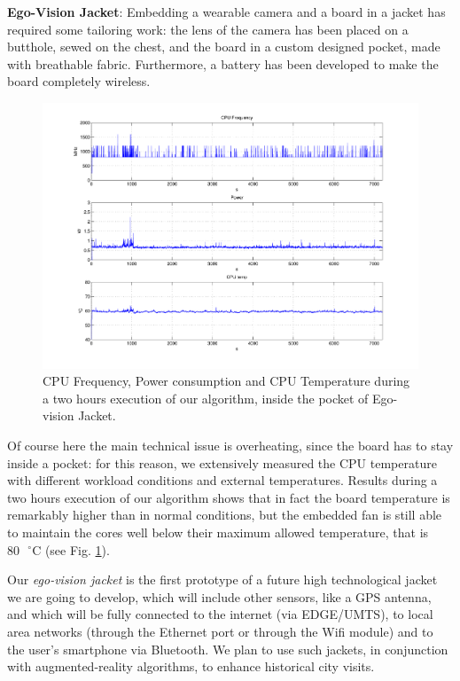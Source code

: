 \textbf{Ego-Vision Jacket}: Embedding a wearable camera and a board in a jacket has required some tailoring work: the lens of the camera has been placed on a butthole, sewed on the chest, and the board in a custom designed pocket, made with breathable fabric. Furthermore, a battery has been developed to make the board completely wireless. 

\begin{figure}[t!]
\centering
\includegraphics[width=1.2\linewidth,angle=90]{Figures/consumi.pdf}
\caption{CPU Frequency, Power consumption and CPU Temperature during a two hours execution of our algorithm, inside the pocket of Ego-vision Jacket.}
\label{jacket}
\end{figure}

Of course here the main technical issue is overheating, since the board has to stay inside a pocket: for this reason, we extensively measured the CPU temperature with different workload conditions and external temperatures. Results during a two hours execution of our algorithm shows that in fact the board temperature is remarkably higher than in normal conditions, but the embedded fan is still able to maintain the cores well below their maximum allowed temperature, that is $80\text{ }^{\circ}\text{C}$ (see Fig. \ref{jacket}).

Our \textit{ego-vision jacket} is the first prototype of a future high technological jacket we are going to develop, which will include other sensors, like a GPS antenna, and which will be fully connected to the internet (via EDGE/UMTS), to local area networks (through the Ethernet port or through the Wifi module) and to the user's smartphone via Bluetooth. We plan to use such jackets, in conjunction with augmented-reality algorithms, to enhance historical city visits.

